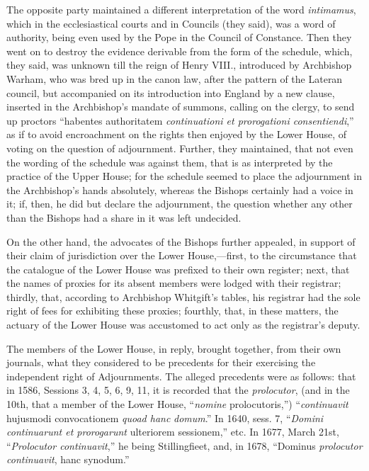 The opposite party maintained
a different interpretation of the word \emph{intimamus}, which in the
ecclesiastical courts and in Councils (they said), was a word of
authority, being even used by the Pope in the Council of Constance.
Then they went on to destroy the evidence derivable from the form of
the schedule, which, they said, was unknown till the reign of Henry
VIII., introduced by Archbishop Warham, who was bred up in the canon
law, after the pattern of the Lateran council, but accompanied
on its introduction into England by a new clause, inserted in the
Archbishop's mandate of summons, calling on the clergy, to send up
proctors ``habentes authoritatem \emph{continuationi et prorogationi
consentiendi},'' as if to avoid encroachment on the rights then
enjoyed by the Lower House, of voting on the question of adjournment.
Further, they maintained, that not even the wording of the schedule
was against them, that is as interpreted by the practice of the Upper
House; for the schedule seemed to place the adjournment in the
Archbishop's hands absolutely, whereas the Bishops certainly had a
voice in it; if, then, he did but declare the adjournment, the
question whether any other than the Bishops had a share in it was left
undecided.

On the other hand, the
advocates of the Bishops further appealed, in support of their claim
of jurisdiction over the Lower House,—first, to the circumstance
that the catalogue of the Lower House was prefixed to their own
register; next, that the names of proxies for its absent members were
lodged with their registrar; thirdly, that, according to Archbishop
Whitgift's tables, his registrar had the sole right of fees for
exhibiting these proxies; fourthly, that, in these matters, the
actuary of the Lower House was accustomed to act only as the registrar's
deputy.

The members of the Lower
House, in reply, brought together, from their own journals, what they
considered to be precedents for their exercising the independent right
of Adjournments. The alleged precedents were as follows: that in 1586,
Sessions 3, 4, 5, 6, 9, 11, it is recorded that the \emph{prolocutor},
(and in the 10th, that a member of the Lower House, ``\emph{nomine}
prolocutoris,'') ``\emph{continuavit} hujusmodi convocationem \emph{quoad
hanc} \emph{domum}.'' In 1640, sess. 7, ``\emph{Domini
continuarunt et prorogarunt} ulteriorem sessionem,'' etc. In 1677,
March 21st, ``\emph{Prolocutor continuavit},'' he being Stillingfieet,
and, in 1678, ``Dominus \emph{prolocutor continuavit}, hanc synodum.''

